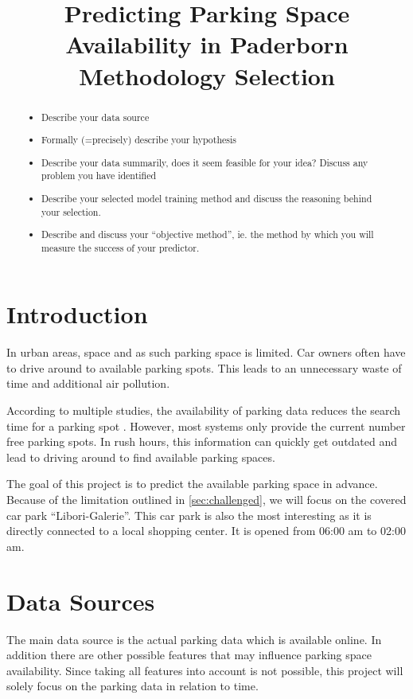 



\title{Predicting Parking Space Availability in Paderborn\\
Methodology Selection}
\maketitle

\begin{abstract}
  \begin{itemize}
    \item Describe your data source
    \item Formally (=precisely) describe your hypothesis
    \item Describe your data summarily, does it seem feasible for your idea? Discuss any problem you have identified
    \item Describe your selected model training method and discuss the reasoning behind your selection.
    \item Describe and discuss your ``objective method'', ie. the method by which you will measure the success of your predictor.
  \end{itemize}
\end{abstract}

\section{Introduction}

In urban areas, space and as such parking space is limited. Car owners often have to drive around to available parking spots. This leads to an unnecessary waste of time and additional air pollution. 

According to multiple studies, the availability of parking data reduces the search time for a parking spot \cite{Asakura1994}\cite{Caicedo2010228}. However, most systems only provide the current number free parking spots. In rush hours, this information can quickly get outdated and lead to driving around to find available parking spaces.

The goal of this project is to predict the available parking space in advance. Because of the limitation outlined in \ref{sec:challenged}, we will focus on the covered car park ``Libori-Galerie''. This car park is also the most interesting as it is directly connected to a local shopping center. It is opened from 06:00 am to 02:00 am.

\section{Data Sources}\label{data sources}
The main data source is the actual parking data which is available online. In addition there are other possible features that may influence parking space availability. Since taking all features into account is not possible, this project will solely focus on the parking data in relation to time. 

